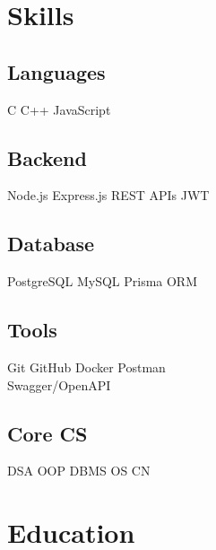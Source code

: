 \documentclass[]{deedy-resume-openfont}
\renewcommand{\sectionsep}{\vspace{8pt}}
\begin{document}

%
%

\begin{minipage}[t]{0.33\textwidth}


\section{Skills}

\subsection{Languages}
C \textbullet{} C++ \textbullet{} JavaScript 
\sectionsep

\subsection{Backend}
Node.js \textbullet{} Express.js \textbullet{} REST APIs \textbullet{} JWT
\sectionsep

\subsection{Database}
PostgreSQL \textbullet{} MySQL \textbullet{} Prisma ORM
\sectionsep

\subsection{Tools}
Git \textbullet{} GitHub \textbullet{} Docker \textbullet{} Postman \\ \textbullet{} Swagger/OpenAPI
\sectionsep

\subsection{Core CS}
DSA \textbullet{} OOP \textbullet{} DBMS \textbullet{} OS \textbullet{} CN
\sectionsep


\section{Education}


\end{minipage}
\end{document}
